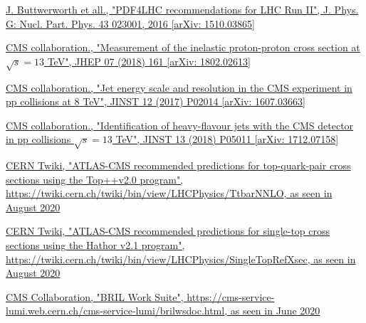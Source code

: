 \documentclass[a4paper, 10pt, openright]{report}
\begin{document}
\begin{thebibliography}{1}
\href{https://arxiv.org/abs/1510.03865}{J. Buttwerworth et all.,
"PDF4LHC recommendations for LHC Run II", J. Phys. G: Nucl. Part. Phys. 43 023001, 2016 [arXiv: 1510.03865]}

\href{https://arxiv.org/abs/1802.02613}{CMS collaboration.,
"Measurement of the inelastic proton-proton cross section at $\sqrt{s} = 13$ TeV", 	JHEP 07 (2018) 161 [arXiv: 1802.02613]}

\href{https://arxiv.org/abs/1607.03663}{CMS collaboration.,
"Jet energy scale and resolution in the CMS experiment in pp collisions at 8 TeV", 		JINST 12 (2017) P02014 [arXiv: 1607.03663]}

\href{https://arxiv.org/abs/1712.07158}{CMS collaboration.,
"Identification of heavy-flavour jets with the CMS detector in pp collisions $\sqrt{s} = 13$ TeV", 		JINST 13 (2018) P05011 [arXiv: 1712.07158]}

\href{https://twiki.cern.ch/twiki/bin/view/LHCPhysics/TtbarNNLO}{CERN Twiki,
"ATLAS-CMS recommended predictions for top-quark-pair cross sections using the Top++v2.0 program", \url{https://twiki.cern.ch/twiki/bin/view/LHCPhysics/TtbarNNLO}, as seen in August 2020}

\href{https://twiki.cern.ch/twiki/bin/view/LHCPhysics/SingleTopRefXsec}{CERN Twiki, 
"ATLAS-CMS recommended predictions for single-top cross sections using the Hathor v2.1 program",
\url{https://twiki.cern.ch/twiki/bin/view/LHCPhysics/SingleTopRefXsec}, as seen in August 2020}


\href{https://cms-service-lumi.web.cern.ch/cms-service-lumi/brilwsdoc.html}{CMS Collaboration,
"BRIL Work Suite", \url{https://cms-service-lumi.web.cern.ch/cms-service-lumi/brilwsdoc.html}, as seen in June 2020}

\end{thebibliography}
\end{document}
